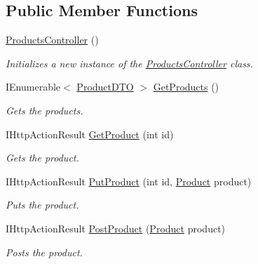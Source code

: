 \subsection*{Public Member Functions}
\begin{DoxyCompactItemize}
\item 
\hyperlink{class_open_1_1_g_i_1_1hypermart_1_1_controllers_1_1_a_p_i_1_1_products_controller_ad7451660ccc9180ae0d2bca8e347d426}{Products\+Controller} ()
\begin{DoxyCompactList}\small\item\em Initializes a new instance of the \hyperlink{class_open_1_1_g_i_1_1hypermart_1_1_controllers_1_1_a_p_i_1_1_products_controller}{Products\+Controller} class. \end{DoxyCompactList}\item 
I\+Enumerable$<$ \hyperlink{class_open_1_1_g_i_1_1hypermart_1_1_data_transformation_objects_1_1_product_d_t_o}{Product\+D\+TO} $>$ \hyperlink{class_open_1_1_g_i_1_1hypermart_1_1_controllers_1_1_a_p_i_1_1_products_controller_a717b795b9b5fdecb23a0fcc81b33f34f}{Get\+Products} ()
\begin{DoxyCompactList}\small\item\em Gets the products. \end{DoxyCompactList}\item 
I\+Http\+Action\+Result \hyperlink{class_open_1_1_g_i_1_1hypermart_1_1_controllers_1_1_a_p_i_1_1_products_controller_a68f971a94461093b48568e4f6f38393c}{Get\+Product} (int id)
\begin{DoxyCompactList}\small\item\em Gets the product. \end{DoxyCompactList}\item 
I\+Http\+Action\+Result \hyperlink{class_open_1_1_g_i_1_1hypermart_1_1_controllers_1_1_a_p_i_1_1_products_controller_a13a51589f39ed8e1f7e6b0de1a969ac5}{Put\+Product} (int id, \hyperlink{class_open_1_1_g_i_1_1hypermart_1_1_models_1_1_product}{Product} product)
\begin{DoxyCompactList}\small\item\em Puts the product. \end{DoxyCompactList}\item 
I\+Http\+Action\+Result \hyperlink{class_open_1_1_g_i_1_1hypermart_1_1_controllers_1_1_a_p_i_1_1_products_controller_a0fad687e249ba71420482808c61760e4}{Post\+Product} (\hyperlink{class_open_1_1_g_i_1_1hypermart_1_1_models_1_1_product}{Product} product)
\begin{DoxyCompactList}\small\item\em Posts the product. \end{DoxyCompactList}\item 

\end{DoxyCompactItemize}
